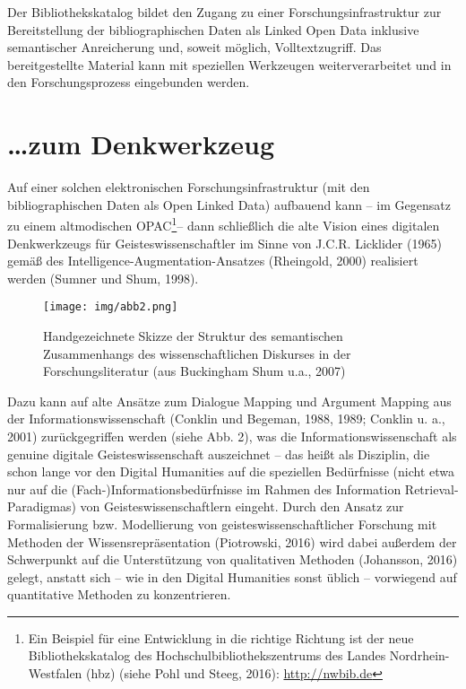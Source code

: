 \documentclass[a4paper,
fontsize=11pt,
oneside,
numbers=noperiodatend,
parskip=half-,
bibliography=totoc,
final
]{scrartcl}
\begin{document}
Der Bibliothekskatalog bildet den Zugang zu einer
Forschungsinfrastruktur zur Bereitstellung der bibliographischen Daten
als Linked Open Data inklusive semantischer Anreicherung und, soweit
möglich, Volltextzugriff. Das bereitgestellte Material kann mit
speziellen Werkzeugen weiterverarbeitet und in den Forschungsprozess
eingebunden werden.

\section*{\ldots{}zum Denkwerkzeug}\label{zum-denkwerkzeug}

Auf einer solchen elektronischen Forschungsinfrastruktur (mit den
bibliographischen Daten als Open Linked Data) aufbauend kann -- im
Gegensatz zu einem altmodischen OPAC\footnote{Ein Beispiel für eine
  Entwicklung in die richtige Richtung ist der neue Bibliothekskatalog
  des Hochschulbibliothekszentrums des Landes Nordrhein-Westfalen (hbz)
  (siehe Pohl und Steeg, 2016): \url{http://nwbib.de}}-- dann
schließlich die alte Vision eines digitalen Denkwerkzeugs für
Geisteswissenschaftler im Sinne von J.C.R. Licklider (1965) gemäß des
Intelligence-Augmentation-Ansatzes (Rheingold, 2000) realisiert werden
(Sumner und Shum, 1998).

\begin{figure}
\centering
\texttt{[image: img/abb2.png]}
\caption{Handgezeichnete Skizze der Struktur des semantischen
Zusammenhangs des wissenschaftlichen Diskurses in der
Forschungsliteratur (aus Buckingham Shum u.a., 2007)}
\end{figure}

Dazu kann auf alte Ansätze zum Dialogue Mapping und Argument Mapping aus
der Informationswissenschaft (Conklin und Begeman, 1988, 1989; Conklin
u. a., 2001) zurückgegriffen werden (siehe Abb. 2), was die
Informationswissenschaft als genuine digitale Geisteswissenschaft
auszeichnet -- das heißt als Disziplin, die schon lange vor den Digital
Humanities auf die speziellen Bedürfnisse (nicht etwa nur auf die
(Fach-)Informationsbedürfnisse im Rahmen des Information
Retrieval-Paradigmas) von Geisteswissenschaftlern eingeht. Durch den
Ansatz zur Formalisierung bzw. Modellierung von
geisteswissenschaftlicher Forschung mit Methoden der
Wissensrepräsentation (Piotrowski, 2016) wird dabei außerdem der
Schwerpunkt auf die Unterstützung von qualitativen Methoden (Johansson,
2016) gelegt, anstatt sich -- wie in den Digital Humanities sonst üblich
-- vorwiegend auf quantitative Methoden zu konzentrieren.
\end{document}
